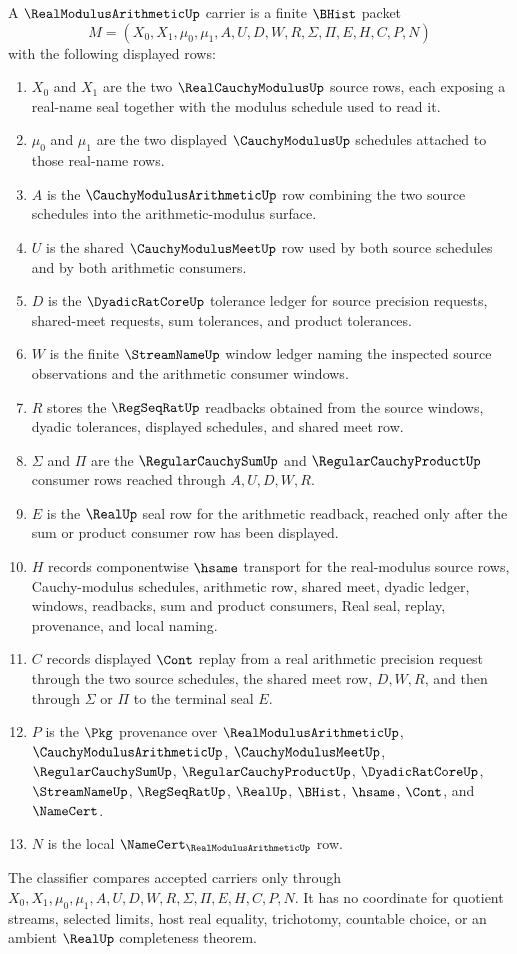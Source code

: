 \begin{definition}
\label{def:real-modulus-arithmetic-carrier}
A $\RealModulusArithmeticUp$ carrier is a finite $\BHist$ packet
$$
M=(X_0,X_1,\mu_0,\mu_1,A,U,D,W,R,\Sigma,\Pi,E,H,C,P,N)
$$
with the following displayed rows:
\begin{enumerate}
\item $X_0$ and $X_1$ are the two $\RealCauchyModulusUp$ source rows, each exposing a real-name seal together with the modulus schedule used to read it.
\item $\mu_0$ and $\mu_1$ are the two displayed $\CauchyModulusUp$ schedules attached to those real-name rows.
\item $A$ is the $\CauchyModulusArithmeticUp$ row combining the two source schedules into the arithmetic-modulus surface.
\item $U$ is the shared $\CauchyModulusMeetUp$ row used by both source schedules and by both arithmetic consumers.
\item $D$ is the $\DyadicRatCoreUp$ tolerance ledger for source precision requests, shared-meet requests, sum tolerances, and product tolerances.
\item $W$ is the finite $\StreamNameUp$ window ledger naming the inspected source observations and the arithmetic consumer windows.
\item $R$ stores the $\RegSeqRatUp$ readbacks obtained from the source windows, dyadic tolerances, displayed schedules, and shared meet row.
\item $\Sigma$ and $\Pi$ are the $\RegularCauchySumUp$ and $\RegularCauchyProductUp$ consumer rows reached through $A,U,D,W,R$.
\item $E$ is the $\RealUp$ seal row for the arithmetic readback, reached only after the sum or product consumer row has been displayed.
\item $H$ records componentwise $\hsame$ transport for the real-modulus source rows, Cauchy-modulus schedules, arithmetic row, shared meet, dyadic ledger, windows, readbacks, sum and product consumers, Real seal, replay, provenance, and local naming.
\item $C$ records displayed $\Cont$ replay from a real arithmetic precision request through the two source schedules, the shared meet row, $D,W,R$, and then through $\Sigma$ or $\Pi$ to the terminal seal $E$.
\item $P$ is the $\Pkg$ provenance over $\RealModulusArithmeticUp$, $\CauchyModulusArithmeticUp$, $\CauchyModulusMeetUp$, $\RegularCauchySumUp$, $\RegularCauchyProductUp$, $\DyadicRatCoreUp$, $\StreamNameUp$, $\RegSeqRatUp$, $\RealUp$, $\BHist$, $\hsame$, $\Cont$, and $\NameCert$.
\item $N$ is the local $\NameCert_{\RealModulusArithmeticUp}$ row.
\end{enumerate}
The classifier compares accepted carriers only through $X_0,X_1,\mu_0,\mu_1,A,U,D,W,R,\Sigma,\Pi,E,H,C,P,N$. It has no coordinate for quotient streams, selected limits, host real equality, trichotomy, countable choice, or an ambient $\RealUp$ completeness theorem.
\end{definition}

